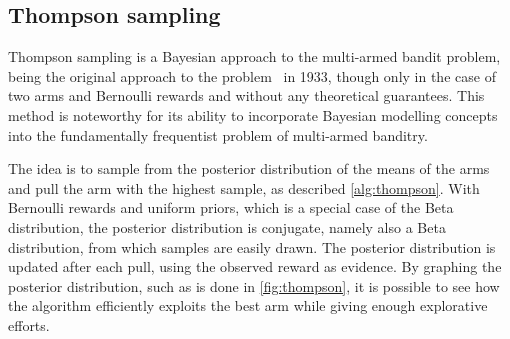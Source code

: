 \subsection{Thompson sampling}
\label{sec:thompson}
Thompson sampling is a Bayesian approach to the multi-armed bandit problem, being the original approach to the problem~\autocite{thompson1933} in 1933, though only in the case of two arms and Bernoulli rewards and without any theoretical guarantees.
This method is noteworthy for its ability to incorporate Bayesian modelling concepts into the fundamentally frequentist problem of multi-armed banditry.

The idea is to sample from the posterior distribution of the means of the arms and pull the arm with the highest sample, as described \cref{alg:thompson}.
With Bernoulli rewards and uniform priors, which is a special case of the Beta distribution, the posterior distribution is conjugate, namely also a Beta distribution, from which samples are easily drawn.
The posterior distribution is updated after each pull, using the observed reward as evidence.
By graphing the posterior distribution, such as is done in \cref{fig:thompson}, it is possible to see how the algorithm efficiently exploits the best arm while giving enough explorative efforts.

